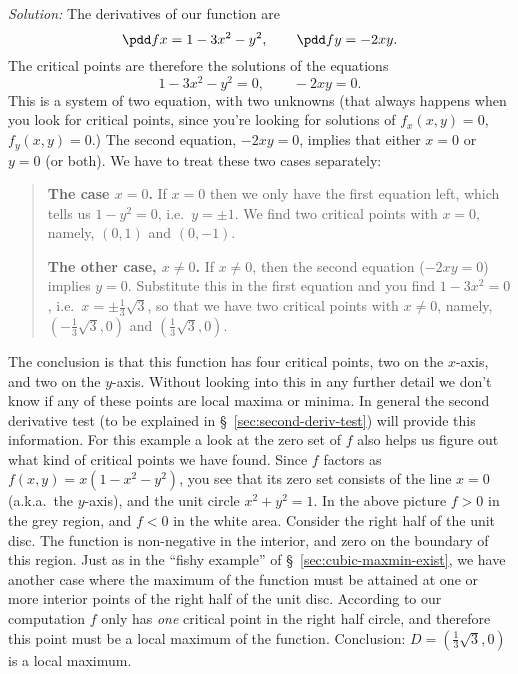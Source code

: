 \textit{Solution: } The derivatives of our function are
\[
\pdd fx = 1-3x^2-y^2,\qquad
\pdd fy = -2xy.
\]
The critical points are therefore the solutions of the equations
\[
1-3x^2-y^2=0,\qquad -2xy=0.
\]
This is a system of two equation, with two unknowns (that always happens
when you look for critical points, since you're looking for solutions of
$f_x(x,y) = 0$, $f_y(x,y)=0$.)  The second equation, $-2xy=0$, implies that
either $x=0$ or $y=0$ (or both).  We have to treat these two cases
separately:
\begin{quote}
  \begin{trivlist}
  \item [\bf The case $x=0$. ] If $x=0$ then we only have the first
    equation left, which tells us $1-y^2=0$, i.e.\ $y=\pm1$.  We find two
    critical points with $x=0$, namely, $(0,1)$ and $(0,-1)$.
  \item [\bf The other case, $x\neq0$. ] If $x\neq0$, then the second
    equation ($-2xy=0$) implies $y=0$.  Substitute this in the first
    equation and you find $1-3x^2=0$, i.e.\ $x=\pm\frac{1} {3}\sqrt{3}$, so
    that we have two critical points with $x\neq0$, namely,
    $(-\frac13\sqrt3, 0)$ and $(\frac13\sqrt3, 0)$.
  \end{trivlist}
\end{quote}
The conclusion is that this function has four critical points, two on the
$x$-axis, and two on the $y$-axis.  Without looking into this in any
further detail we don't know if any of these points are local maxima or
minima.  In general the second derivative test (to be explained in
\S~\ref{sec:second-deriv-test}) will provide this information.  For this
example a look at the zero set of $f$ also helps us figure out what kind of
critical points we have found.  Since $f$ factors as $f(x, y) =
x(1-x^2-y^2)$, you see that its zero set consists of the line $x=0$
(a.k.a.\ the $y$-axis), and the unit circle $x^2+y^2=1$.  In the above
picture $f>0$ in the grey region, and $f<0$ in the white area.  Consider
the right half of the unit disc.  The function is non-negative in the
interior, and zero on the boundary of this region.  Just as in the ``fishy
example'' of \S~\ref{sec:cubic-maxmin-exist}, we have another case where
the maximum of the function must be attained at one or more interior points
of the right half of the unit disc.  According to our computation $f$ only
has \textit{one} critical point in the right half circle, and therefore
this point must be a local maximum of the function.  Conclusion:
$D=(\frac13\sqrt3,0)$ is a local maximum.

